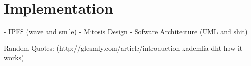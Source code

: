 \chapter{Implementation}
- IPFS (wave and smile)
- Mitosis Design
- Sofware Architecture (UML and shit)

Random Quotes:
(http://gleamly.com/article/introduction-kademlia-dht-how-it-works)

